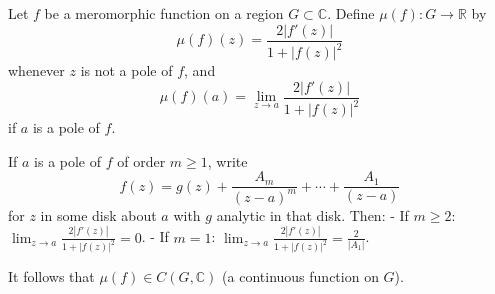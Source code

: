 Let $f$ be a meromorphic function on a region $G \subset \mathbb{C}$. Define $\mu(f): G \to \mathbb{R}$ by
$$\mu(f)(z) = \frac{2|f'(z)|}{1 + |f(z)|^2}$$
whenever $z$ is not a pole of $f$, and
$$\mu(f)(a) = \lim_{z \to a} \frac{2|f'(z)|}{1 + |f(z)|^2}$$
if $a$ is a pole of $f$.

If $a$ is a pole of $f$ of order $m \geq 1$, write
$$f(z) = g(z) + \frac{A_m}{(z-a)^m} + \cdots + \frac{A_1}{(z-a)}$$
for $z$ in some disk about $a$ with $g$ analytic in that disk. Then:
- If $m \geq 2$: $\displaystyle \lim_{z \to a} \frac{2|f'(z)|}{1 + |f(z)|^2} = 0$.
- If $m = 1$: $\displaystyle \lim_{z \to a} \frac{2|f'(z)|}{1 + |f(z)|^2} = \frac{2}{|A_1|}$.

It follows that $\mu(f) \in C(G, \mathbb{C})$ (a continuous function on $G$).
